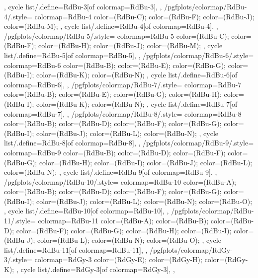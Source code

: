 {{{    },
    cycle list/.define={RdBu-3}{[of colormap=RdBu-3]},
  },
  /pgfplots/colormap/RdBu-4/.style={
    colormap={RdBu-4}{
      color=(RdBu-C);
      color=(RdBu-F);
      color=(RdBu-J);
      color=(RdBu-M);
    },
    cycle list/.define={RdBu-4}{[of colormap=RdBu-4]},
  },
  /pgfplots/colormap/RdBu-5/.style={
    colormap={RdBu-5}{
      color=(RdBu-C);
      color=(RdBu-F);
      color=(RdBu-H);
      color=(RdBu-J);
      color=(RdBu-M);
    },
    cycle list/.define={RdBu-5}{[of colormap=RdBu-5]},
  },
  /pgfplots/colormap/RdBu-6/.style={
    colormap={RdBu-6}{
      color=(RdBu-B);
      color=(RdBu-E);
      color=(RdBu-G);
      color=(RdBu-I);
      color=(RdBu-K);
      color=(RdBu-N);
    },
    cycle list/.define={RdBu-6}{[of colormap=RdBu-6]},
  },
  /pgfplots/colormap/RdBu-7/.style={
    colormap={RdBu-7}{
      color=(RdBu-B);
      color=(RdBu-E);
      color=(RdBu-G);
      color=(RdBu-H);
      color=(RdBu-I);
      color=(RdBu-K);
      color=(RdBu-N);
    },
    cycle list/.define={RdBu-7}{[of colormap=RdBu-7]},
  },
  /pgfplots/colormap/RdBu-8/.style={
    colormap={RdBu-8}{
      color=(RdBu-B);
      color=(RdBu-D);
      color=(RdBu-F);
      color=(RdBu-G);
      color=(RdBu-I);
      color=(RdBu-J);
      color=(RdBu-L);
      color=(RdBu-N);
    },
    cycle list/.define={RdBu-8}{[of colormap=RdBu-8]},
  },
  /pgfplots/colormap/RdBu-9/.style={
    colormap={RdBu-9}{
      color=(RdBu-B);
      color=(RdBu-D);
      color=(RdBu-F);
      color=(RdBu-G);
      color=(RdBu-H);
      color=(RdBu-I);
      color=(RdBu-J);
      color=(RdBu-L);
      color=(RdBu-N);
    },
    cycle list/.define={RdBu-9}{[of colormap=RdBu-9]},
  },
  /pgfplots/colormap/RdBu-10/.style={
    colormap={RdBu-10}{
      color=(RdBu-A);
      color=(RdBu-B);
      color=(RdBu-D);
      color=(RdBu-F);
      color=(RdBu-G);
      color=(RdBu-I);
      color=(RdBu-J);
      color=(RdBu-L);
      color=(RdBu-N);
      color=(RdBu-O);
    },
    cycle list/.define={RdBu-10}{[of colormap=RdBu-10]},
  },
  /pgfplots/colormap/RdBu-11/.style={
    colormap={RdBu-11}{
      color=(RdBu-A);
      color=(RdBu-B);
      color=(RdBu-D);
      color=(RdBu-F);
      color=(RdBu-G);
      color=(RdBu-H);
      color=(RdBu-I);
      color=(RdBu-J);
      color=(RdBu-L);
      color=(RdBu-N);
      color=(RdBu-O);
    },
    cycle list/.define={RdBu-11}{[of colormap=RdBu-11]},
  },
  /pgfplots/colormap/RdGy-3/.style={
    colormap={RdGy-3}{
      color=(RdGy-E);
      color=(RdGy-H);
      color=(RdGy-K);
    },
    cycle list/.define={RdGy-3}{[of colormap=RdGy-3]},
  },
}
